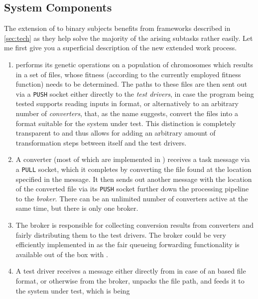 \subsection{System Components}
\label{sec:components}
The extension of \xmlmate to binary subjects benefits from frameworks described in \cref{sec:tech} as they 
help solve the majority of the arising subtasks rather easily. Let me first give you a superficial description
of the new extended \xmlmate work process. 
\begin{enumerate}
  \item \xmlmate performs its genetic operations on a population of chromosomes which results in a set of 
  \xml files, whose fitness (according to the currently employed fitness function) needs to be determined.
  The paths to these files are then sent out via a \zmq \texttt{PUSH} socket either directly to the 
  \emph{test drivers}, in case the program being tested supports reading inputs in \xml format, or alternatively 
  to an arbitrary number of \emph{converters}, that, as the name suggests, convert the \xml files into a format 
  suitable for the system under test. This distinction is completely transparent to \xmlmate and thus allows for 
  adding an arbitrary amount of transformation steps between itself and the test drivers.
  \item A converter (most of which are implemented in \python) receives a task message via a 
  \zmq \texttt{PULL} socket, which it completes by converting the file found at the location specified in the message. 
  It then sends out another message with the location of the converted file via its \texttt{PUSH} socket further 
  down the processing pipeline to the \emph{broker}.
  There can be an unlimited number of converters active at the same time, but there is only one broker.
  \item The broker is responsible for collecting conversion results from converters and fairly distributing them 
  to the test drivers. The broker could be very efficiently implemented in \python as the fair 
  queueing forwarding functionality is available out of the box with \zmq.
  \item A test driver receives a message either directly from \xmlmate in case of an \xml based file format, 
  or otherwise from the broker, unpacks the file path, and feeds it to the system under test, which is being 

\end{enumerate}
